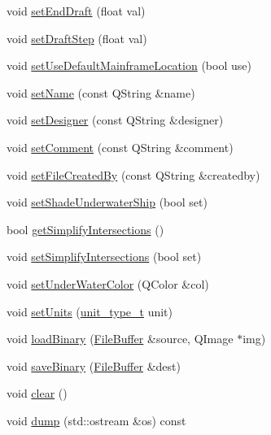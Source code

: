 \begin{DoxyCompactItemize}
\item 
void \hyperlink{classShipCAD_1_1ProjectSettings_a45e70a08ac47cdf30971a7386af702a9}{set\-End\-Draft} (float val)
\item 
void \hyperlink{classShipCAD_1_1ProjectSettings_a45081194c5e105780429b0f214bab186}{set\-Draft\-Step} (float val)
\item 
void \hyperlink{classShipCAD_1_1ProjectSettings_a7c0f0e54fb2fb94a70b823fca6a6a58d}{set\-Use\-Default\-Mainframe\-Location} (bool use)
\item 
void \hyperlink{classShipCAD_1_1ProjectSettings_acaa6149ff4c93c829a72a3a3d2ff5239}{set\-Name} (const Q\-String \&name)
\item 
void \hyperlink{classShipCAD_1_1ProjectSettings_abde123a71eba642ff1dbd62d547aa684}{set\-Designer} (const Q\-String \&designer)
\item 
void \hyperlink{classShipCAD_1_1ProjectSettings_a64e942847dd0838f04dc4ec32e9bc30e}{set\-Comment} (const Q\-String \&comment)
\item 
void \hyperlink{classShipCAD_1_1ProjectSettings_a326e18ff53ba0f916d4d8cfab5a2d17f}{set\-File\-Created\-By} (const Q\-String \&createdby)
\item 
void \hyperlink{classShipCAD_1_1ProjectSettings_a0f40362f42e6dfd4147d69573c00988f}{set\-Shade\-Underwater\-Ship} (bool set)
\item 
bool \hyperlink{classShipCAD_1_1ProjectSettings_a2e5f2bfb546885af0af8d857198b8cc9}{get\-Simplify\-Intersections} ()
\item 
void \hyperlink{classShipCAD_1_1ProjectSettings_a138264f53da99f6a1765ea7aec95096a}{set\-Simplify\-Intersections} (bool set)
\item 
void \hyperlink{classShipCAD_1_1ProjectSettings_a06b1260b284a988fb62b49f7ab4d5bf3}{set\-Under\-Water\-Color} (Q\-Color \&col)
\item 
void \hyperlink{classShipCAD_1_1ProjectSettings_a2310573735d3c0ad17ca290bca083f99}{set\-Units} (\hyperlink{namespaceShipCAD_ac6a7a28b4b063771afae92decb602da5}{unit\-\_\-type\-\_\-t} unit)
\item 
void \hyperlink{classShipCAD_1_1ProjectSettings_af6012d62299292d0757955b14c6bd854}{load\-Binary} (\hyperlink{classShipCAD_1_1FileBuffer}{File\-Buffer} \&source, Q\-Image $\ast$img)
\item 
void \hyperlink{classShipCAD_1_1ProjectSettings_aebda4677da789819020d1ea1623ec035}{save\-Binary} (\hyperlink{classShipCAD_1_1FileBuffer}{File\-Buffer} \&dest)
\item 
void \hyperlink{classShipCAD_1_1ProjectSettings_a9e0ce44e6aea8e57608baee2a3b05827}{clear} ()
\item 
void \hyperlink{classShipCAD_1_1ProjectSettings_a9caa9e15bc03de5b6092c419a58a87e8}{dump} (std\-::ostream \&os) const 
\end{DoxyCompactItemize}


